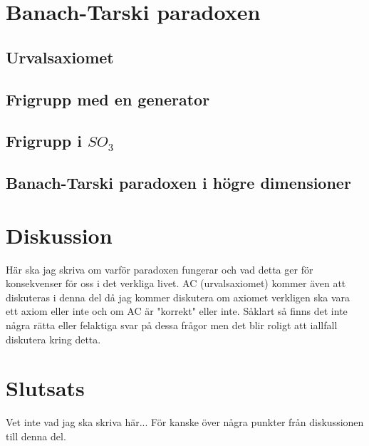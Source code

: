 \documentclass{article}
\theoremstyle{definition}
\begin{document}
\begin{center}
\end{center}

\section{Banach-Tarski paradoxen}

\subsection{Urvalsaxiomet}
\subsection{Frigrupp med en generator}
\subsection{Frigrupp i \texorpdfstring{$SO_3$}{}}
\subsection{Banach-Tarski paradoxen i högre dimensioner}

\section{Diskussion}
Här ska jag skriva om varför paradoxen fungerar och vad detta ger för konsekvenser för oss i det verkliga livet. AC (urvalsaxiomet) kommer även att 
diskuteras i denna del då jag kommer diskutera om axiomet verkligen ska vara ett axiom eller inte och om AC är "korrekt" eller inte. Såklart så finns 
det inte några rätta eller felaktiga svar på dessa frågor men det blir roligt att iallfall diskutera kring detta.

\section{Slutsats}
Vet inte vad jag ska skriva här... För kanske över några punkter från diskussionen till denna del.
\end{document}
